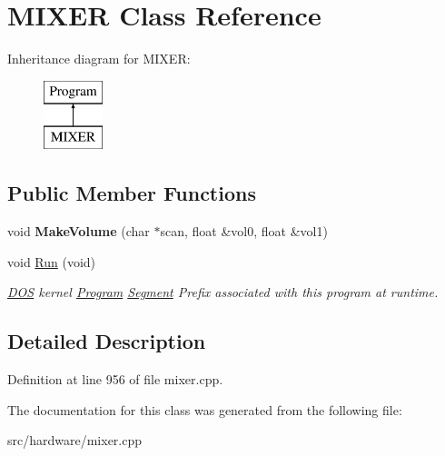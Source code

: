 \hypertarget{classMIXER}{\section{M\-I\-X\-E\-R Class Reference}
\label{classMIXER}
}
Inheritance diagram for M\-I\-X\-E\-R\-:\begin{figure}[H]
\begin{center}
\leavevmode
\includegraphics[height=2.000000cm]{classMIXER}
\end{center}
\end{figure}
\subsection*{Public Member Functions}
\begin{DoxyCompactItemize}
\item 
\hypertarget{classMIXER_a85b8e090dc7b9a2c6d3fdf0935e7f824}{void {\bfseries Make\-Volume} (char $\ast$scan, float \&vol0, float \&vol1)}\label{classMIXER_a85b8e090dc7b9a2c6d3fdf0935e7f824}

\item 
\hypertarget{classMIXER_a5043b553511d83536361a96111c17a31}{void \hyperlink{classMIXER_a5043b553511d83536361a96111c17a31}{Run} (void)}\label{classMIXER_a5043b553511d83536361a96111c17a31}

\begin{DoxyCompactList}\small\item\em \hyperlink{classDOS}{D\-O\-S} kernel \hyperlink{classProgram}{Program} \hyperlink{structSegment}{Segment} Prefix associated with this program at runtime. \end{DoxyCompactList}\end{DoxyCompactItemize}


\subsection{Detailed Description}


Definition at line 956 of file mixer.\-cpp.



The documentation for this class was generated from the following file\-:\begin{DoxyCompactItemize}
\item 
src/hardware/mixer.\-cpp\end{DoxyCompactItemize}
